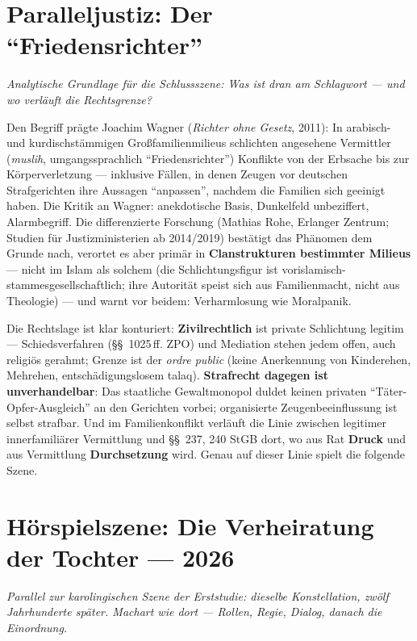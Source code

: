 \documentclass[11pt,a4paper,ngerman]{scrartcl}
\newcommand{\chipbase}[2]{\hspace{0pt}{\footnotesize\textcolor{#1}{[\textsc{#2}]}}}
\newcommand{\chipplausibel}[1]{\chipbase{chipamber}{#1}}
\begin{document}
\section{Paralleljustiz: Der \enquote{Friedensrichter}}
\noindent\textit{Analytische Grundlage für die Schlussszene: Was ist dran am Schlagwort --- und wo verläuft die Rechtsgrenze?}
\medskip

Den Begriff prägte Joachim Wagner (\emph{Richter ohne Gesetz}, 2011): In arabisch- und kurdischstämmigen Großfamilienmilieus schlichten angesehene Vermittler (\emph{muslih}, umgangssprachlich \enquote{Friedensrichter}) Konflikte von der Erbsache bis zur Körperverletzung --- inklusive Fällen, in denen Zeugen vor deutschen Strafgerichten ihre Aussagen \enquote{anpassen}, nachdem die Familien sich geeinigt haben. Die Kritik an Wagner: anekdotische Basis, Dunkelfeld unbeziffert, Alarmbegriff. Die differenzierte Forschung (Mathias Rohe, Erlanger Zentrum; Studien für Justizministerien ab 2014/2019) bestätigt das Phänomen dem Grunde nach, verortet es aber primär in \textbf{Clanstrukturen bestimmter Milieus} --- nicht im Islam als solchem (die Schlichtungsfigur ist vorislamisch-stammesgesellschaftlich; ihre Autorität speist sich aus Familienmacht, nicht aus Theologie) --- und warnt vor beidem: Verharmlosung wie Moralpanik. \chipplausibel{plausibel}

Die Rechtslage ist klar konturiert: \textbf{Zivilrechtlich} ist private Schlichtung legitim --- Schiedsverfahren (\S\S~1025\,ff. ZPO) und Mediation stehen jedem offen, auch religiös gerahmt; Grenze ist der \emph{ordre public} (keine Anerkennung von Kinderehen, Mehrehen, entschädigungslosem talaq). \textbf{Strafrecht dagegen ist unverhandelbar}: Das staatliche Gewaltmonopol duldet keinen privaten \enquote{Täter-Opfer-Ausgleich} an den Gerichten vorbei; organisierte Zeugenbeeinflussung ist selbst strafbar. Und im Familienkonflikt verläuft die Linie zwischen legitimer innerfamiliärer Vermittlung und \S\S~237, 240 StGB dort, wo aus Rat \textbf{Druck} und aus Vermittlung \textbf{Durchsetzung} wird. Genau auf dieser Linie spielt die folgende Szene.
\section{Hörspielszene: Die Verheiratung der Tochter --- 2026}
\noindent\textit{Parallel zur karolingischen Szene der Erststudie: dieselbe Konstellation, zwölf Jahrhunderte später. Machart wie dort --- Rollen, Regie, Dialog, danach die Einordnung.}
\medskip
\end{document}
